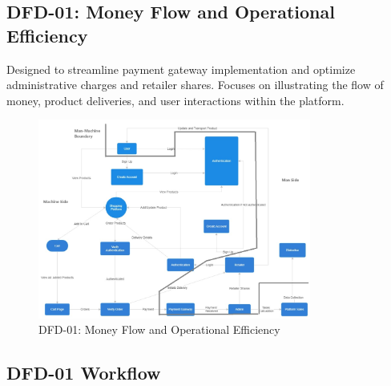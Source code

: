 \documentclass[a4paper,12pt]{article}
\begin{document}
\subsection{DFD-01: Money Flow and Operational Efficiency}
Designed to streamline payment gateway implementation and optimize administrative charges and retailer shares. Focuses on illustrating the flow of money, product deliveries, and user interactions within the platform.

\begin{figure}
    \centering
    \includegraphics[width=0.8\textwidth]{dfd1.jpg}
    \caption{DFD-01: Money Flow and Operational Efficiency}
\end{figure}

\subsection{DFD-01 Workflow}
\end{document}
